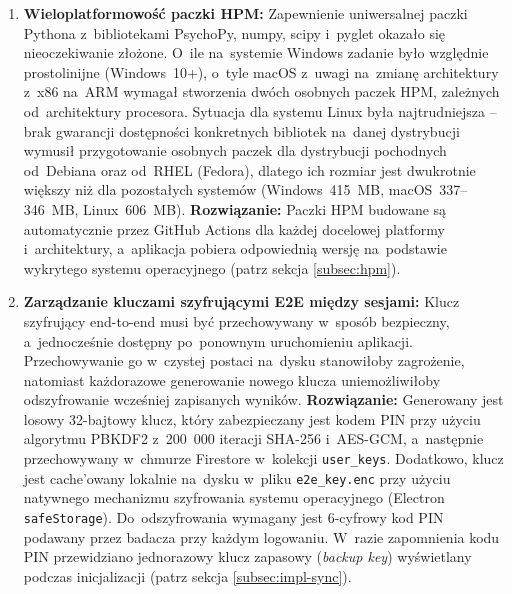 \documentclass[12pt, a4paper, oneside]{report}
\begin{document}
\begin{enumerate}
	\item \textbf{Wieloplatformowość paczki HPM:}
	      Zapewnienie uniwersalnej paczki Pythona z~bibliotekami PsychoPy, numpy,
	      scipy i~pyglet okazało się nieoczekiwanie złożone. O~ile na~systemie Windows
	      zadanie było względnie prostolinijne (Windows~10+), o~tyle macOS
	      z~uwagi na~zmianę architektury z~x86 na~ARM wymagał stworzenia dwóch osobnych
	      paczek HPM, zależnych od~architektury procesora. Sytuacja dla systemu Linux
	      była najtrudniejsza -- brak gwarancji dostępności konkretnych bibliotek
	      na~danej dystrybucji wymusił przygotowanie osobnych paczek dla dystrybucji
	      pochodnych od~Debiana oraz od~RHEL (Fedora), dlatego ich rozmiar jest dwukrotnie
	      większy niż dla pozostałych systemów (Windows~415~MB, macOS~337--346~MB,
	      Linux~606~MB).
	      \textbf{Rozwiązanie:} Paczki HPM budowane są automatycznie przez GitHub
	      Actions dla każdej docelowej platformy i~architektury, a~aplikacja pobiera
	      odpowiednią wersję na~podstawie wykrytego systemu operacyjnego
	      (patrz sekcja \ref{subsec:hpm}).

	\item \textbf{Zarządzanie kluczami szyfrującymi E2E między sesjami:}
	      Klucz szyfrujący end-to-end musi być przechowywany w~sposób bezpieczny,
	      a~jednocześnie dostępny po~ponownym uruchomieniu aplikacji. Przechowywanie
	      go w~czystej postaci na~dysku stanowiłoby zagrożenie, natomiast każdorazowe
	      generowanie nowego klucza uniemożliwiłoby odszyfrowanie wcześniej zapisanych
	      wyników.
	      \textbf{Rozwiązanie:} Generowany jest losowy 32-bajtowy klucz, który
	      zabezpieczany jest kodem PIN przy użyciu algorytmu PBKDF2 z~200~000 iteracji
	      SHA-256 i~AES-GCM, a~następnie przechowywany w~chmurze Firestore w~kolekcji
	      \texttt{user\_keys}. Dodatkowo, klucz jest cache'owany lokalnie na~dysku
	      w~pliku \texttt{e2e\_key.enc} przy użyciu natywnego mechanizmu szyfrowania
	      systemu operacyjnego (Electron \texttt{safeStorage}). Do~odszyfrowania
	      wymagany jest 6-cyfrowy kod PIN podawany przez badacza przy każdym logowaniu.
	      W~razie zapomnienia kodu PIN przewidziano jednorazowy klucz zapasowy
	      (\textit{backup key}) wyświetlany podczas inicjalizacji
	      (patrz sekcja \ref{subsec:impl-sync}).


\end{enumerate}
\end{document}
